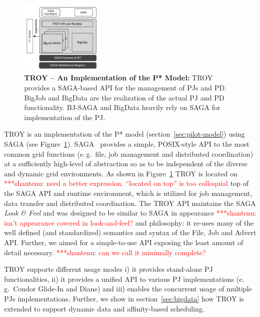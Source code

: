 \documentclass[conference,final]{IEEEtran}
\newcommand{\jhanote}[1]{ {\textcolor{red} { ***shantenu: #1 }}}
\newcommand{\jhanote}[1]{}
\newcommand{\upp}{\vspace*{-0.5em}}
\begin{document}

\begin{figure}[t]
	\centering
		\includegraphics[width=0.35\textwidth]{figures/pstar_troy.pdf}
	\caption{\textbf{TROY -- An Implementation of the P* Model:}  TROY provides 
	a SAGA-based API for the management of PJs and PD. BigJob and BigData are 
	the realization of the actual PJ and PD functionality. BJ-SAGA and BigData 
	heavily rely on SAGA for implementation of the PJ.\upp
	}
	\label{fig:figures_pstar_troy}
\end{figure}

TROY is an implementation of the P* model
(section~\ref{sec:pilot-model}) using SAGA (see
Figure~\ref{fig:figures_pstar_troy}). SAGA~\cite{saga_url,saga_gfd90}
provides a simple, POSIX-style API to the most common grid functions
(e.\,g.\ file, job management and distributed coordination) at a
sufficiently high-level of abstraction so as to be independent of the
diverse and dynamic grid environments. As shown in
Figure~\ref{fig:figures_pstar_troy} TROY is located on \jhanote{need a
  better expression. ``located on top'' is too colloquial} top of the
SAGA API and runtime environment, which is utilized for job
management, data transfer and distributed coordination. The TROY API
maintains the SAGA {\it Look \& Feel} and was designed to be similar
to SAGA in appearance \jhanote{isn't appearance covered in
  look-and-feel?} and philosophy: it re-uses many of the well defined
(and standardized) semantics and syntax of the File, Job and Advert
API. Further, we aimed for a simple-to-use API exposing the least
amount of detail necessary.\jhanote{can we call it minimally
  complete?}

TROY supports different usage modes i) it provides stand-alone
PJ functionalities, ii) it provides a unified API to various
PJ implementations (e.\,g.\ Condor Glide-In and Diane) and iii)
enables the concurrent usage of multiple PJs
implementations. Further, we show in section~\ref{sec:bigdata} how
TROY is extended to support dynamic data and affinity-based
scheduling.
\end{document}
